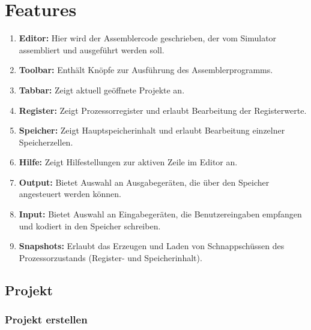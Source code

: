 
\section{Features}

\begin{enumerate}
\item \textbf{Editor:} Hier wird der Assemblercode geschrieben, der vom
Simulator assembliert und ausgeführt werden soll.
\item \textbf{Toolbar:} Enthält Knöpfe zur Ausführung des Assemblerprogramms.
\item \textbf{Tabbar:} Zeigt aktuell geöffnete Projekte an.
\item \textbf{Register:} Zeigt Prozessorregister und erlaubt Bearbeitung der
Registerwerte.
\item \textbf{Speicher:} Zeigt Hauptspeicherinhalt und erlaubt Bearbeitung
einzelner Speicherzellen.
\item \textbf{Hilfe:} Zeigt Hilfestellungen zur aktiven Zeile im Editor an.
\item \textbf{Output:} Bietet Auswahl an Ausgabegeräten, die über den Speicher
angesteuert werden können.
\item \textbf{Input:} Bietet Auswahl an Eingabegeräten, die Benutzereingaben
empfangen und kodiert in den Speicher schreiben.
\item \textbf{Snapshots:} Erlaubt das Erzeugen und Laden von Schnappschüssen
des Prozessorzustands (Register- und Speicherinhalt).
\end{enumerate}


\subsection{Projekt}

\subsubsection{Projekt erstellen}
\label{sec:project_creation}

